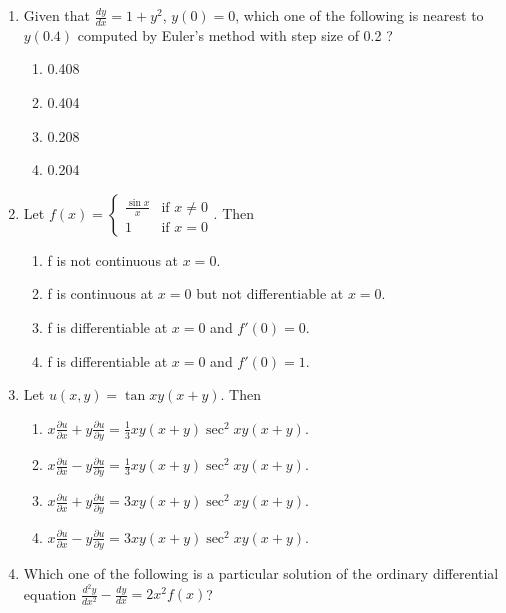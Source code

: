 \documentclass[a4paper,10pt]{article}
\begin{document}
\begin{enumerate}
\item Given that $\frac{dy}{dx} = 1+y^2$, $y(0) = 0$, which one of the following is nearest to $y(0.4)$ computed by Euler's method with step size of 0.2 ?
\hfill{}

\begin{multicols}{4}
\begin{enumerate}
\item 0.408
\item 0.404
\item 0.208
\item 0.204
\end{enumerate}
\end{multicols}

\item Let $f(x) = \begin{cases} \frac{\sin x}{x} & \text{if } x \neq 0 \\ 1 & \text{if } x = 0 \end{cases}$. Then
\hfill{}

\begin{enumerate}
\item f is not continuous at $x=0$.
\item f is continuous at $x=0$ but not differentiable at $x=0$.
\item f is differentiable at $x=0$ and $f'(0)=0$.
\item f is differentiable at $x=0$ and $f'(0)=1$.
\end{enumerate}

\item Let $u(x, y) = \tan{xy(x + y)}$. Then
\hfill{}

\begin{enumerate}
\item $x \frac{\partial u}{\partial x} + y \frac{\partial u}{\partial y} = \frac{1}{3}xy(x+y) \sec^2{xy(x + y)}$.
\item $x \frac{\partial u}{\partial x} - y \frac{\partial u}{\partial y} = \frac{1}{3}xy(x+y) \sec^2{xy(x + y)}$.
\item $x \frac{\partial u}{\partial x} + y \frac{\partial u}{\partial y} = 3xy(x + y) \sec^2{xy(x+y)}$.
\item $x \frac{\partial u}{\partial x} - y \frac{\partial u}{\partial y} = 3xy(x+y) \sec^2{xy(x + y)}$.
\end{enumerate}

\item Which one of the following is a particular solution of the ordinary differential equation $\frac{d^2 y}{dx^2} - \frac{dy}{dx} = 2x^2 f(x)$?
\hfill{}


\end{enumerate}
\end{document}
